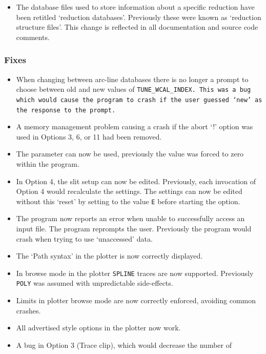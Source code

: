 \documentclass[twoside,11pt,nolof]{starlink}
\begin{document}
\begin{itemize}
\item The database files used to store information about a specific
   reduction have been retitled `reduction databases'.  Previously
   these were known as `reduction structure files'.  This change is
   reflected in all documentation and source code comments.
\end{itemize}

\subsubsection{Fixes}

\begin{itemize}
\item When changing between arc-line databases there is no longer
   a prompt to choose between old and new values of
   \tt{TUNE\_WCAL\_INDEX}.
   This was a bug which would cause the program to crash if the user
   guessed `new' as the response to the prompt.
\item A memory management problem causing a crash if the abort `!'
   option was used in Options 3, 6, or 11 had been removed.
\item The parameter 
   can now be used, previously the
   value was forced to zero within the program.
\item In Option 4, the slit setup can now be edited.  Previously,
   each invocation of Option 4 would recalculate the settings.
   The settings can now be edited without this `reset' by setting
    to the value \texttt{E}
   before starting the option.
\item The program now reports an error when unable to successfully
   access an input file.  The program reprompts the user.
   Previously the program would crash when trying to use `unaccessed'
   data.
\item The `Path syntax' in the plotter is now correctly displayed.
\item In browse mode in the plotter \texttt{SPLINE} traces are now supported.
   Previously \texttt{POLY} was assumed with unpredictable side-effects.
\item Limits in plotter browse mode are now correctly enforced, avoiding
   common crashes.
\item All advertised style options in the plotter now work.
\item A bug in Option 3 (Trace clip), which would decrease the number of

\end{itemize}
\end{document}
